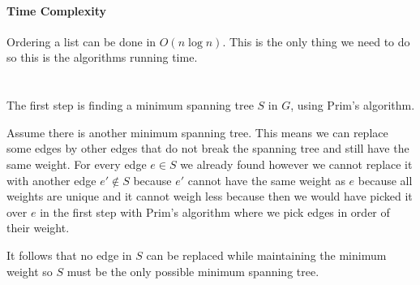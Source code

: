 \documentclass[12pt, a4paper]{article}
\begin{document}
\paragraph{Time Complexity}
Ordering a list can be done in $O(n \log n)$. This is the only thing we need to do so this is the algorithms running time.

\section{} %

The first step is finding a minimum spanning tree $S$ in $G$, using Prim's algorithm.

Assume there is another minimum spanning tree. This means we can replace some edges by other edges that do not break the spanning tree and still have the same weight. For every edge $e \in S$ we already found however we cannot replace it with another edge $e' \not\in S$ because $e'$ cannot have the same weight as $e$ because all weights are unique and it cannot weigh less because then we would have picked it over $e$ in the first step with Prim's algorithm where we pick edges in order of their weight.

It follows that no edge in $S$ can be replaced while maintaining the minimum weight so $S$ must be the only possible minimum spanning tree.
\end{document}
